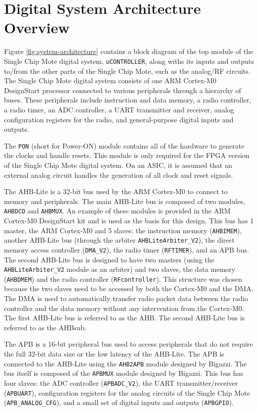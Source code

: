 \section{Digital System Architecture Overview}
Figure \ref{fig:system-architecture} contains a block diagram of the top module of the Single Chip Mote digital system, \texttt{uCONTROLLER}, along withs its inputs and outputs to/from the other parts of the Single Chip Mote, such as the analog/RF circuits. The Single Chip Mote digital system consists of one ARM Cortex-M0 DesignStart processor connected to various peripherals through a hierarchy of buses. These peripherals include instruction and data memory, a radio controller, a radio timer, an ADC controller, a UART transmitter and receiver, analog configuration registers for the radio, and general-purpose digital inputs and outputs.

The \texttt{PON} (short for Power-ON) module contains all of the hardware to generate the clocks and handle resets. This module is only required for the FPGA version of the Single Chip Mote digital system. On an ASIC, it is assumed that an external analog circuit handles the generation of all clock and reset signals.

The AHB-Lite is a 32-bit bus used by the ARM Cortex-M0 to connect to memory and peripherals. The main AHB-Lite bus is composed of two modules, \texttt{AHBDCD} and \texttt{AHBMUX}. An example of these modules is provided in the ARM Cortex-M0 DesignStart kit and is used as the basis for this design. This bus has 1 master, the ARM Cortex-M0 and 5 slaves: the instruction memory (\texttt{AHBIMEM}), another AHB-Lite bus (through the arbiter \texttt{AHBLiteArbiter\_V2}), the direct memory access controller (\texttt{DMA\_V2}), the radio timer (\texttt{RFTIMER}), and an APB bus. The second AHB-Lite bus is designed to have two masters (using the \texttt{AHBLiteArbiter\_V2} module as an arbiter) and two slaves, the data memory (\texttt{AHBDMEM}) and the radio controller (\texttt{RFcontroller}). This structure was chosen because the two slaves need to be accessed by both the Cortex-M0 and the DMA. The DMA is used to automatically transfer radio packet data between the radio controller and the data memory without any intervention from the Cortex-M0. The first AHB-Lite bus is referred to as the AHB. The second AHB-Lite bus is referred to as the AHBsub.

The APB is a 16-bit peripheral bus used to access peripherals that do not require the full 32-bit data size or the low latency of the AHB-Lite. The APB is connected to the AHB-Lite using the \texttt{AHB2APB} module designed by Bigazzi. The bus itself is composed of the \texttt{APBMUX} module designed by Bigazzi. This bus has four slaves: the ADC controller (\texttt{APBADC\_V2}), the UART transmitter/receiver (\texttt{APBUART}), configuration registers for the analog circuits of the Single Chip Mote (\texttt{APB\_ANALOG\_CFG}), and a small set of digital inputs and outputs (\texttt{APBGPIO}).

